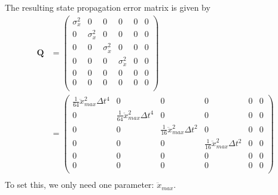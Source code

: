 \documentclass[12pt]{article}
\begin{document}
The resulting state propagation error matrix is given by
\begin{equation}
\begin{split}
\mathbf{Q}
    & =
    \begin{pmatrix}
        \sigma_x^2 & 0 & 0 & 0 & 0 & 0 \\
        0 & \sigma_x^2 & 0 & 0 & 0 & 0 \\
        0 & 0 & \sigma_{\dot{x}}^2 & 0 & 0 & 0 \\
        0 & 0 & 0 & \sigma_{\dot{x}}^2 & 0 & 0 \\
        0 & 0 & 0 & 0 & 0 & 0 \\
        0 & 0 & 0 & 0 & 0 & 0 \\
    \end{pmatrix}
    \\
    & =
    \begin{pmatrix}
        \frac{1}{64} \ddot{x}_{max}^2 \Delta{t}^4 & 0 & 0 & 0 & 0 & 0 \\
        0 & \frac{1}{64} \ddot{x}_{max}^2 \Delta{t}^4 & 0 & 0 & 0 & 0 \\
        0 & 0 & \frac{1}{16} \ddot{x}_{max}^2 \Delta{t}^2 & 0 & 0 & 0 \\
        0 & 0 & 0 & \frac{1}{16} \ddot{x}_{max}^2 \Delta{t}^2 & 0 & 0 \\
        0 & 0 & 0 & 0 & 0 & 0 \\
        0 & 0 & 0 & 0 & 0 & 0 \\
    \end{pmatrix}
    \\
\end{split}
\end{equation}
To set this, we only need one parameter: $\ddot{x}_{max}$.
\end{document}

